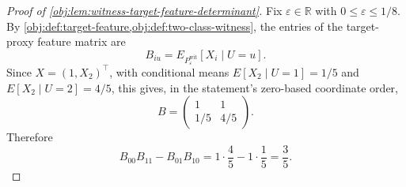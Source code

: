 \begin{proof}[Proof of \cref{obj:lem:witness-target-feature-determinant}]
Fix \(\varepsilon\in\mathbb R\) with \(0\le \varepsilon\le 1/8\).  By \cref{obj:def:target-feature,obj:def:two-class-witness}, the entries of the target-proxy feature matrix are
\[
B_{iu}
=
E_{P_{\varepsilon}^{\mathrm{wit}}}\!\left[X_i\mid U=u\right].
\]
Since \(X=(1,X_2)^\top\), with conditional means \(E[X_2\mid U=1]=1/5\) and \(E[X_2\mid U=2]=4/5\), this gives, in the statement's zero-based coordinate order,
\[
B
=
\begin{pmatrix}
1&1\\[0.2em]
1/5&4/5
\end{pmatrix}.
\] %
Therefore
\[
B_{00}B_{11}-B_{01}B_{10}
=
1\cdot \frac45-1\cdot \frac15
=
\frac35 .
\] %
\end{proof}
